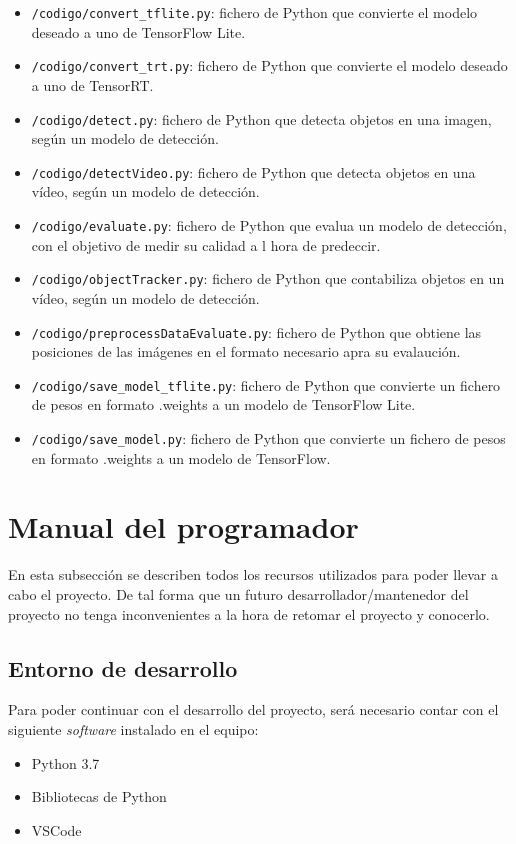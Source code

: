 \begin{itemize}
    \item \texttt{/codigo/convert\_tflite.py}: fichero de Python que convierte el modelo deseado a uno de TensorFlow Lite.
    \item \texttt{/codigo/convert\_trt.py}: fichero de Python que convierte el modelo deseado a uno de TensorRT.
    \item \texttt{/codigo/detect.py}: fichero de Python que detecta objetos en una imagen, según un modelo de detección.
    \item \texttt{/codigo/detectVideo.py}: fichero de Python que detecta objetos en una vídeo, según un modelo de detección.
    \item \texttt{/codigo/evaluate.py}: fichero de Python que evalua un modelo de detección, con el objetivo de medir su calidad a l hora de predeccir.
    \item \texttt{/codigo/objectTracker.py}: fichero de Python que contabiliza objetos en un vídeo, según un modelo de detección.
    \item \texttt{/codigo/preprocessDataEvaluate.py}: fichero de Python que obtiene las posiciones de las imágenes en el formato necesario apra su evalaución.
    \item \texttt{/codigo/save\_model\_tflite.py}: fichero de Python que convierte un fichero de pesos en formato .weights a un modelo de TensorFlow Lite. 
    \item \texttt{/codigo/save\_model.py}: fichero de Python que convierte un fichero de pesos en formato .weights a un modelo de TensorFlow.  
\end{itemize}

\section{Manual del programador}
En esta subsección se describen todos los recursos utilizados para poder llevar a cabo el proyecto.
De tal forma que un futuro desarrollador/mantenedor del proyecto no tenga inconvenientes a la hora de retomar el proyecto y conocerlo.

\subsection{Entorno de desarrollo}
Para poder continuar con el desarrollo del proyecto, será necesario contar con el siguiente \textit{software} instalado en el equipo:
\begin{itemize}
    \tightlist
    \item Python 3.7
    \item Bibliotecas de Python
    \item VSCode
    
\end{itemize}

